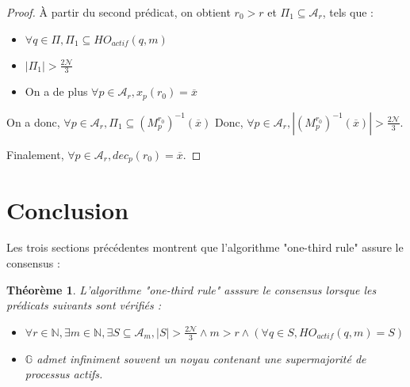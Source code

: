 \documentclass{article}
\newtheorem{theorem}{Théorème}
\begin{document}
\begin{proof}
	À partir du second prédicat, on obtient $r_0 > r$ et $\Pi_1 \subseteq \mathcal{A}_r$, tels que :
	\begin{itemize}

		\item $\forall q \in \Pi, \Pi_1 \subseteq HO_{actif}(q, m)$
		\item $|\Pi_1| > \frac{2\mathcal{N}}{3}$
		\item On a de plus $\forall p \in \mathcal{A}_r, x_p(r_0) = \overline{x}$

	\end{itemize}

	On a donc, $\forall p \in \mathcal{A}_r, \Pi_1 \subseteq (M_p^{r_0})^{-1}(\overline{x}) $
	Donc, $\forall p \in \mathcal{A}_r, |(M_p^{r_0})^{-1}(\overline{x})| > \frac{2\mathcal{N}}{3} $.

	Finalement, $\forall p \in \mathcal{A}_r, dec_p(r_0) = \overline{x}$.

\end{proof}

\section{Conclusion}

Les trois sections précédentes montrent que l'algorithme "one-third rule" assure le consensus :

	\begin{theorem}

		 L'algorithme "one-third rule" asssure le consensus lorsque les prédicats suivants sont vérifiés :
		\begin{itemize}
			\item $\forall r \in \mathds{N}, \exists m \in \mathds{N}, \exists S \subseteq \mathcal{A}_m, |S| > \frac{2\mathcal{N}}{3} \wedge m > r \wedge (\forall q \in S, HO_{actif}(q, m) = S)$
			\item $\mathds{G}$ admet infiniment souvent un noyau contenant une supermajorité de processus actifs.
		\end{itemize}
	\end{theorem}
\end{document}
